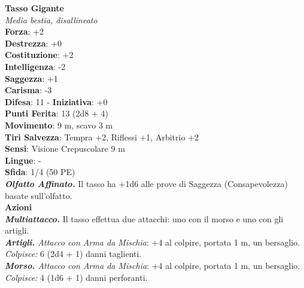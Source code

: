 \begin{multicols}{2}
\medskip\textbf{Tasso Gigante}\\
\emph{Media bestia, disallineato}\\
\textbf{Forza}: +2\\
\textbf{Destrezza}: +0\\
\textbf{Costituzione}: +2\\
\textbf{Intelligenza}: -2\\
\textbf{Saggezza}: +1\\
\textbf{Carisma}: -3\\
\textbf{Difesa}: 11 - \textbf{Iniziativa}: +0\\
\textbf{Punti Ferita}: 13 (2d8 + 4)\\
\textbf{Movimento}: 9 m, scavo 3 m\\
\textbf{Tiri Salvezza}: Tempra +2, Riflessi +1, Arbitrio +2\\
\textbf{Sensi}: Visione Crepuscolare 9 m \\
\textbf{Lingue}: -\\
\textbf{Sfida}: 1/4 (50 PE)\smallskip\\
\emph{\textbf{Olfatto Affinato.}} Il tasso ha +1d6 alle prove di Saggezza (Consapevolezza) basate sull'olfatto.\\
\smallskip\textbf{Azioni}\\
\emph{\textbf{Multiattacco.}} Il tasso effettua due attacchi: uno con il morso e uno con gli artigli.\\
\emph{\textbf{Artigli.} Attacco con Arma da Mischia}: +4 al colpire, portata 1 m, un bersaglio.\\
\emph{Colpisce:} 6 (2d4 + 1) danni taglienti.\\
\emph{\textbf{Morso.} Attacco con Arma da Mischia}: +4 al colpire, portata 1 m, un bersaglio.\\
\emph{Colpisce:} 4 (1d6 + 1) danni perforanti.\\


\end{multicols}
